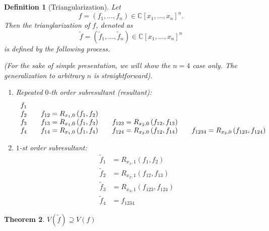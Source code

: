 \documentclass{article}%
\newtheorem{theorem}{Theorem}
\newtheorem{definition}[theorem]{Definition}
\begin{document}
\begin{definition}
[Triangularization]Let%
\[
f=\left(  f_{1},\ldots,f_{n}\right)  \in\mathbb{C}\left[  x_{1},\ldots
,x_{n}\right]  ^{n}\text{.}%
\]
Then the \emph{trianglarization }of $f$, denoted as
\[
\tilde{f}=\left(  \tilde{f}_{1},\ldots,\tilde{f}_{n}\right)  \in
\mathbb{C}\left[  x_{1},\ldots,x_{n}\right]  ^{n}%
\]
is defined by the following process. \newline

\noindent(For the sake of simple presentation, we will show the $n=4$ case
only. The generalization to arbitrary $n$ is straightforward).

\begin{enumerate}
\item Repeated $0$-th order subresultant (resultant):%
\[%
\begin{array}
[c]{llll}%
f_{1}\ \ \  &  &  & \\
f_{2} & f_{12}=R_{x_{1},0}\left(  f_{1},f_{2}\right)  \ \ \  &  & \\
f_{3} & f_{13}=R_{x_{1},0}\left(  f_{1},f_{3}\right)  & f_{123}=R_{x_{2}%
,0}\left(  f_{12},f_{13}\right)  \ \ \  & \\
f_{4} & f_{14}=R_{x_{1},0}\left(  f_{1},f_{4}\right)  & f_{124}=R_{x_{2}%
,0}\left(  f_{12},f_{14}\right)  & f_{1234}=R_{x_{3},0}\left(  f_{123}%
,f_{124}\right)
\end{array}
\]


\item $1$-st order subresultant:%
\begin{align*}
\tilde{f}_{1}  &  =R_{x_{1},1}\left(  f_{1},f_{2}\right) \\
\tilde{f}_{2}  &  =R_{x_{2},1}\left(  f_{12},f_{13}\right) \\
\tilde{f}_{3}  &  =R_{x_{3},1}\left(  f_{123},f_{124}\right) \\
\tilde{f}_{4}  &  =f_{1234}%
\end{align*}

\end{enumerate}
\end{definition}

\begin{theorem}
$V(\tilde{f})\supseteq V(f)$
\end{theorem}
\end{document}

